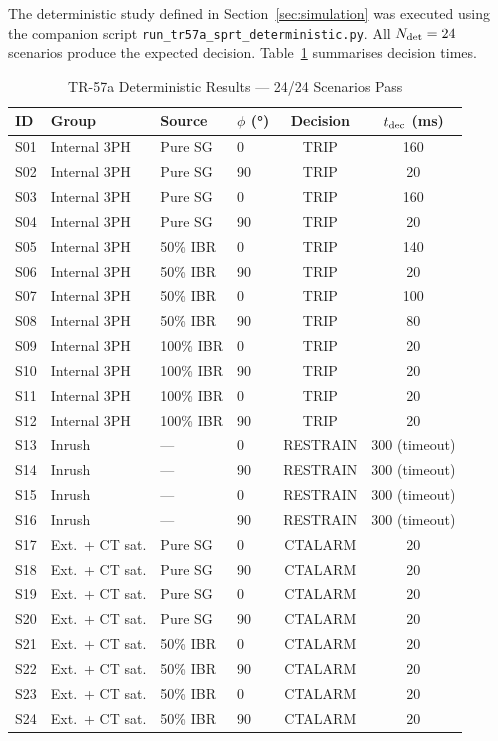 \documentclass[11pt, a4paper]{article}
\begin{document}
The deterministic study defined in Section~\ref{sec:simulation} was executed
using the companion script \texttt{run\_tr57a\_sprt\_deterministic.py}.
All $N_{\rm det} = 24$ scenarios produce the expected decision.
Table~\ref{tab:det_results} summarises decision times.

\begin{table}[!t]
\centering
\caption{TR-57a Deterministic Results — 24/24 Scenarios Pass}
\label{tab:det_results}
\renewcommand{\arraystretch}{1.10}
\begin{tabular}{llllcc}
\toprule
ID & Group & Source & $\phi$ (°) & Decision & $t_{\rm dec}$ (ms) \\
\midrule
S01 & Internal 3PH & Pure SG   & 0   & TRIP    & 160 \\
S02 & Internal 3PH & Pure SG   & 90  & TRIP    &  20 \\
S03 & Internal 3PH & Pure SG   & 0   & TRIP    & 160 \\
S04 & Internal 3PH & Pure SG   & 90  & TRIP    &  20 \\
\midrule
S05 & Internal 3PH & 50\% IBR  & 0   & TRIP    & 140 \\
S06 & Internal 3PH & 50\% IBR  & 90  & TRIP    &  20 \\
S07 & Internal 3PH & 50\% IBR  & 0   & TRIP    & 100 \\
S08 & Internal 3PH & 50\% IBR  & 90  & TRIP    &  80 \\
\midrule
S09 & Internal 3PH & 100\% IBR & 0   & TRIP    &  20 \\
S10 & Internal 3PH & 100\% IBR & 90  & TRIP    &  20 \\
S11 & Internal 3PH & 100\% IBR & 0   & TRIP    &  20 \\
S12 & Internal 3PH & 100\% IBR & 90  & TRIP    &  20 \\
\midrule
S13 & Inrush       & ---       & 0   & RESTRAIN & 300 (timeout) \\
S14 & Inrush       & ---       & 90  & RESTRAIN & 300 (timeout) \\
S15 & Inrush       & ---       & 0   & RESTRAIN & 300 (timeout) \\
S16 & Inrush       & ---       & 90  & RESTRAIN & 300 (timeout) \\
\midrule
S17 & Ext.\ + CT sat. & Pure SG  & 0  & CTALARM &  20 \\
S18 & Ext.\ + CT sat. & Pure SG  & 90 & CTALARM &  20 \\
S19 & Ext.\ + CT sat. & Pure SG  & 0  & CTALARM &  20 \\
S20 & Ext.\ + CT sat. & Pure SG  & 90 & CTALARM &  20 \\
\midrule
S21 & Ext.\ + CT sat. & 50\% IBR & 0  & CTALARM &  20 \\
S22 & Ext.\ + CT sat. & 50\% IBR & 90 & CTALARM &  20 \\
S23 & Ext.\ + CT sat. & 50\% IBR & 0  & CTALARM &  20 \\
S24 & Ext.\ + CT sat. & 50\% IBR & 90 & CTALARM &  20 \\
\bottomrule
\end{tabular}
\end{table}
\end{document}
